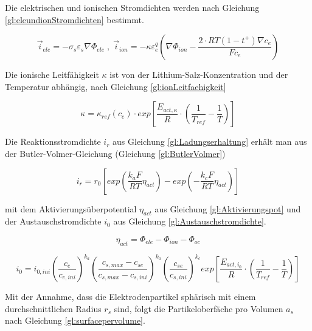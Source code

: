 Die elektrischen und ionischen Stromdichten werden nach Gleichung \ref{gl:eleundionStromdichten} bestimmt.

\begin{equation}
	\vec{i}_{ele} = - \sigma_{s} \varepsilon_{s} \nabla \Phi_{ele} \; , \; \vec{i}_{ion} = - \kappa \varepsilon^{q}_{e} \left( \nabla \Phi_{ion} - \frac{2\cdot RT (1-t^{+})\nabla c_{e}}{F c_{e}} \right) \label{gl:eleundionStromdichten}
\end{equation}

Die ionische Leitfähigkeit $\kappa$ ist von der Lithium-Salz-Konzentration und der Temperatur abhängig, nach Gleichung \ref{gl:ionLeitfaehigkeit}

\begin{equation}
	\kappa = \kappa_{ref} (c_{e}) \cdot exp \left[ \frac{E_{act,\kappa}}{R} \cdot \left( \frac{1}{T_{ref}} - \frac{1}{T} \right) \right] \label{gl:ionLeitfaehigkeit}
\end{equation}

Die Reaktionsstromdichte $i_{r}$ aus Gleichung \ref{gl:Ladungserhaltung} erhält man aus der Butler-Volmer-Gleichung (Gleichung \ref{gl:ButlerVolmer})

\begin{equation}
	i_{r} = r_{0} \left[ exp \left( \frac{k_{a} F}{RT} \eta_{act} \right) - exp\left( -\frac{k_{c}F}{RT} \eta_{act} \right) \right] \label{gl:ButlerVolmer}
\end{equation} 

mit dem Aktivierungsüberpotential $\eta_{act}$ aus Gleichung \ref{gl:Aktivierungspot} und der Austauschstromdichte $i_{0}$ aus Gleichung \ref{gl:Austauschstromdichte}.

\begin{equation}
	\eta_{act} = \Phi_{ele} - \Phi_{ion} - \Phi_{oc} \label{gl:Aktivierungspot}
\end{equation}

\begin{equation}
	i_{0} = i_{0,ini} \left( \frac{c_{e}}{c_{e,ini}} \right)^{k_{a}} \left( \frac{c_{s,max} - c_{se}}{c_{s,max} - c_{s,ini}}\right)^{k_{a}} \left( \frac{c_{se}}{c_{s,ini}} \right)^{k_{c}} exp\left[ \frac{E_{act,i_{0}}}{R} \cdot \left( \frac{1}{T_{ref}} - \frac{1}{T}\right) \right] \label{gl:Austauschstromdichte}
\end{equation}

Mit der Annahme, dass die Elektrodenpartikel sphärisch mit einem durchschnittlichen Radius $r_{s}$ sind, folgt die Partikeloberfäche pro Volumen $a_{s}$ nach Gleichung \ref{gl:surfacepervolume}.

